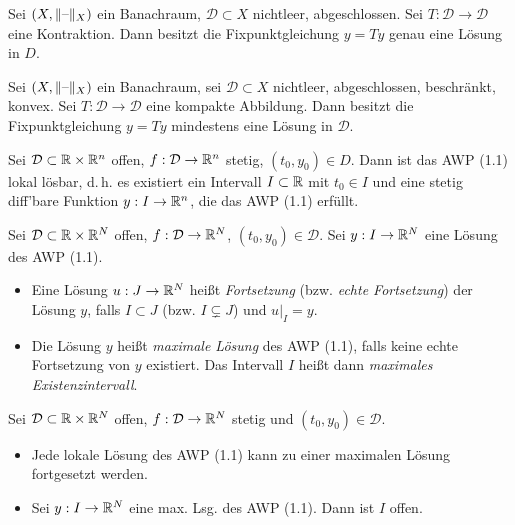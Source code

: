 \documentclass{cheat-sheet}
\newcommand{\D}{\mathcal{D}}
\begin{document}
\begin{satz}
  Sei $(X, \lVert\text{--}\rVert_X)$ ein Banachraum, $\D \subset X$ nichtleer, abgeschlossen. Sei $T : \D \to \D$ eine Kontraktion. Dann besitzt die Fixpunktgleichung $y = Ty$ genau eine Lösung in $D$.
\end{satz}

\begin{satz}
  Sei $(X, \lVert\text{--}\rVert_X)$ ein Banachraum, sei $\D \subset X$ nichtleer, abgeschlossen, beschränkt, konvex. Sei $T : \D \to \D$ eine kompakte Abbildung. Dann besitzt die Fixpunktgleichung $y = Ty$ mindestens eine Lösung in $\D$.
\end{satz}


\begin{satz}
  Sei $\D \subset \R \times \R^n$ offen, $f : \D \to \R^n$ stetig, $(t_0, y_0) \in D$. Dann ist das AWP (1.1) lokal lösbar, d.\,h. es existiert ein Intervall $I \subset \mathbb{R}$ mit $t_0 \in I$ und eine stetig diff'bare Funktion $y : I \to \mathbb{R}^n$, die das AWP (1.1) erfüllt.
\end{satz}



\begin{defn}
  Sei $\D \subset \R \times \R^N$ offen, $f : \D \to \R^N$, $(t_0, y_0) \in \D$. Sei $y : I \to \mathbb{R}^N$ eine Lösung des AWP (1.1).
  \begin{itemize}
    \item Eine Lösung $u : J \to \mathbb{R}^N$ heißt \emph{Fortsetzung} (bzw. \emph{echte Fortsetzung}) der Lösung $y$, falls $I \subset J$ (bzw. $I \subsetneq J$) und $u|_I = y$.
    \item Die Lösung $y$ heißt \emph{maximale Lösung} des AWP (1.1), falls keine echte Fortsetzung von $y$ existiert. Das Intervall $I$ heißt dann \emph{maximales Existenzintervall}.
  \end{itemize}
\end{defn}


\begin{satz}
  Sei $\D \subset \R \times \R^N$ offen, $f : \D \to \R^N$ stetig und $(t_0, y_0) \in \D$.
  \begin{itemize}
    \item Jede lokale Lösung des AWP (1.1) kann zu einer maximalen Lösung fortgesetzt werden.
    \item Sei $y : I \to \mathbb{R}^N$ eine max. Lsg. des AWP (1.1). Dann ist $I$ offen.
  \end{itemize}
\end{satz}
\end{document}
